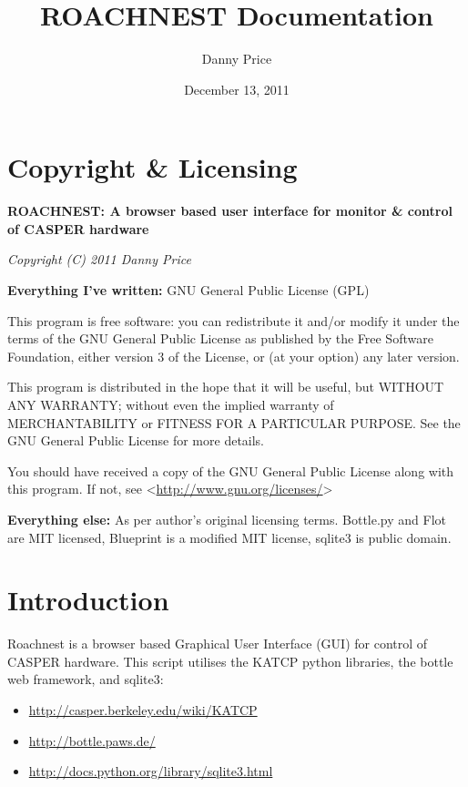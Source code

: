 \documentclass[letterpaper,10pt,english]{sphinxmanual}
\title{ROACHNEST Documentation}
\date{December 13, 2011}
\author{Danny Price}
\begin{document}
\maketitle
\tableofcontents
{}\label{index::doc}



\chapter{Copyright \& Licensing}
\label{index:roachnest-documentation}\label{index:copyright-licensing}
\textbf{ROACHNEST: A browser based user interface for monitor \& control of CASPER hardware}

\emph{Copyright (C) 2011  Danny Price}

\textbf{Everything I've written:} GNU General Public License (GPL)

This program is free software: you can redistribute it and/or modify
it under the terms of the GNU General Public License as published by
the Free Software Foundation, either version 3 of the License, or
(at your option) any later version.

This program is distributed in the hope that it will be useful,
but WITHOUT ANY WARRANTY; without even the implied warranty of
MERCHANTABILITY or FITNESS FOR A PARTICULAR PURPOSE.  See the
GNU General Public License for more details.

You should have received a copy of the GNU General Public License
along with this program.  If not, see \textless{}\href{http://www.gnu.org/licenses/}{http://www.gnu.org/licenses/}\textgreater{}

\textbf{Everything else:} As per author's original licensing terms.
Bottle.py and Flot are MIT licensed, Blueprint is a modified MIT license,
sqlite3 is public domain.


\chapter{Introduction}
\label{index:introduction}
Roachnest is a browser based Graphical User Interface (GUI) for control of CASPER hardware.
This script utilises the KATCP python libraries, the bottle web framework, and sqlite3:
\begin{itemize}
\item {} 
\href{http://casper.berkeley.edu/wiki/KATCP}{http://casper.berkeley.edu/wiki/KATCP}

\item {} 
\href{http://bottle.paws.de/}{http://bottle.paws.de/}

\item {} 
\href{http://docs.python.org/library/sqlite3.html}{http://docs.python.org/library/sqlite3.html}

\end{itemize}
\end{document}
